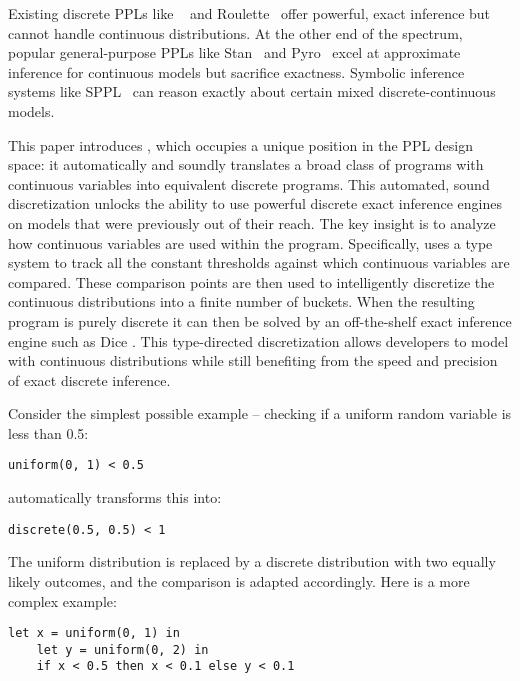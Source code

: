 \documentclass[acmsmall,screen,dvipsnames,x11names,nonacm,anonymous,review]{acmart}
\newcommand{\Slice}{\text{\scshape Slice}\xspace}
\newcommand{\Dice}{\text{\scshape Dice}\xspace}
\begin{document}
Existing discrete PPLs like \Dice~\cite{Holtzen2020Dice} and Roulette~\cite{Moy2025Roulette} offer powerful, exact inference but cannot handle continuous distributions. At the other end of the spectrum, popular general-purpose PPLs like Stan~\cite{Carpenter2017Stan} and Pyro~\cite{Bingham2019Pyro} excel at approximate inference for continuous models but sacrifice exactness. Symbolic inference systems like SPPL~\cite{Saad2021SPPL} can reason exactly about certain mixed discrete-continuous models.

This paper introduces \Slice, which occupies a unique position in the PPL design space: it automatically and soundly translates a broad class of programs with continuous variables into equivalent discrete programs. This automated, sound discretization unlocks the ability to use powerful discrete exact inference engines on models that were previously out of their reach. The key insight is to analyze how continuous variables are used within the program. Specifically, \Slice uses a type system to track all the constant thresholds against which continuous variables are compared. These comparison points are then used to intelligently discretize the continuous distributions into a finite number of buckets. When the resulting program is purely discrete it can then be solved by an off-the-shelf exact inference engine such as Dice \cite{Holtzen2020Dice}. This type-directed discretization allows developers to model with continuous distributions while still benefiting from the speed and precision of exact discrete inference.

Consider the simplest possible example -- checking if a uniform random variable is less than 0.5:

\begin{lstlisting}[aboveskip=1em,belowskip=1em]
    uniform(0, 1) < 0.5
\end{lstlisting}

\noindent \Slice automatically transforms this into:

\begin{lstlisting}[aboveskip=1em,belowskip=1em]
    discrete(0.5, 0.5) < 1
\end{lstlisting}

\noindent The uniform distribution is replaced by a discrete distribution with two equally likely outcomes, and the comparison is adapted accordingly. Here is a more complex example:

\begin{lstlisting}[aboveskip=1em,belowskip=1em]
    let x = uniform(0, 1) in
    let y = uniform(0, 2) in
    if x < 0.5 then x < 0.1 else y < 0.1
\end{lstlisting}
\end{document}
